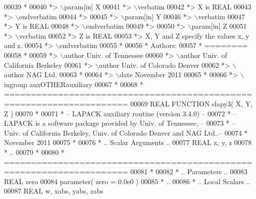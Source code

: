 \begin{DoxyCode}
00039 \textcolor{comment}{*}
00040 \textcolor{comment}{*> \(\backslash\)param[in] X}
00041 \textcolor{comment}{*> \(\backslash\)verbatim}
00042 \textcolor{comment}{*>          X is REAL}
00043 \textcolor{comment}{*> \(\backslash\)endverbatim}
00044 \textcolor{comment}{*>}
00045 \textcolor{comment}{*> \(\backslash\)param[in] Y}
00046 \textcolor{comment}{*> \(\backslash\)verbatim}
00047 \textcolor{comment}{*>          Y is REAL}
00048 \textcolor{comment}{*> \(\backslash\)endverbatim}
00049 \textcolor{comment}{*>}
00050 \textcolor{comment}{*> \(\backslash\)param[in] Z}
00051 \textcolor{comment}{*> \(\backslash\)verbatim}
00052 \textcolor{comment}{*>          Z is REAL}
00053 \textcolor{comment}{*>          X, Y and Z specify the values x, y and z.}
00054 \textcolor{comment}{*> \(\backslash\)endverbatim}
00055 \textcolor{comment}{*}
00056 \textcolor{comment}{*  Authors:}
00057 \textcolor{comment}{*  ========}
00058 \textcolor{comment}{*}
00059 \textcolor{comment}{*> \(\backslash\)author Univ. of Tennessee }
00060 \textcolor{comment}{*> \(\backslash\)author Univ. of California Berkeley }
00061 \textcolor{comment}{*> \(\backslash\)author Univ. of Colorado Denver }
00062 \textcolor{comment}{*> \(\backslash\)author NAG Ltd. }
00063 \textcolor{comment}{*}
00064 \textcolor{comment}{*> \(\backslash\)date November 2011}
00065 \textcolor{comment}{*}
00066 \textcolor{comment}{*> \(\backslash\)ingroup auxOTHERauxiliary}
00067 \textcolor{comment}{*}
00068 \textcolor{comment}{*  =====================================================================}
00069 \textcolor{keyword}{      REAL             }\textcolor{keyword}{FUNCTION }slapy3( X, Y, Z )
00070 \textcolor{comment}{*}
00071 \textcolor{comment}{*  -- LAPACK auxiliary routine (version 3.4.0) --}
00072 \textcolor{comment}{*  -- LAPACK is a software package provided by Univ. of Tennessee,    --}
00073 \textcolor{comment}{*  -- Univ. of California Berkeley, Univ. of Colorado Denver and NAG Ltd..--}
00074 \textcolor{comment}{*     November 2011}
00075 \textcolor{comment}{*}
00076 \textcolor{comment}{*     .. Scalar Arguments ..}
00077       \textcolor{keywordtype}{REAL}               x, y, z
00078 \textcolor{comment}{*     ..}
00079 \textcolor{comment}{*}
00080 \textcolor{comment}{*  =====================================================================}
00081 \textcolor{comment}{*}
00082 \textcolor{comment}{*     .. Parameters ..}
00083       \textcolor{keywordtype}{REAL}               zero
00084       parameter( zero = 0.0e0 )
00085 \textcolor{comment}{*     ..}
00086 \textcolor{comment}{*     .. Local Scalars ..}
00087       \textcolor{keywordtype}{REAL}               w, xabs, yabs, zabs

\end{DoxyCode}
